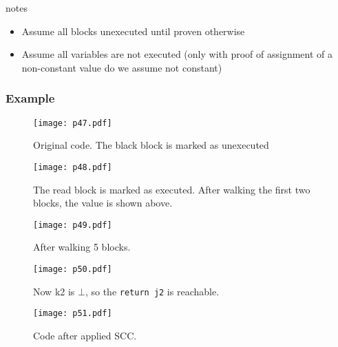 \begin{note}{notes}
	\begin{itemize}
		\item Assume all blocks unexecuted until proven otherwise
		\item Assume all variables are not executed (only with proof of assignment of a non-constant value do we assume not constant)
	\end{itemize}
\end{note}

\subsubsection{Example}

\begin{figure}[H]
	\centering
	\texttt{[image: p47.pdf]}
	\caption{Original code. The black block is marked as unexecuted}
	\label{fig:p47}

\end{figure}




\begin{figure}[H]
	\centering
	\texttt{[image: p48.pdf]}
	\caption{The read block is marked as executed. After walking the first two blocks, the value is shown above.}
	\label{fig:p48}

\end{figure}



\begin{figure}[H]
	\centering
	\texttt{[image: p49.pdf]}
	\caption{After walking 5 blocks.}
	\label{fig:p49}

\end{figure}



\begin{figure}[H]
	\centering
	\texttt{[image: p50.pdf]}
	\caption{Now k2 is $\bot$, so the \texttt{return j2} is reachable.}
	\label{fig:p50}

\end{figure}



\begin{figure}[H]
	\centering
	\texttt{[image: p51.pdf]}
	\caption{Code after applied SCC.}
	\label{fig:p51}

\end{figure}


